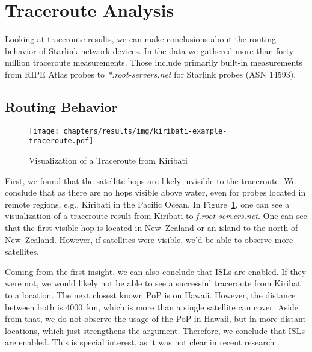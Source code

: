 
\section{Traceroute Analysis} \label{sec:traceroute-analysis}

Looking at traceroute results, we can make conclusions about the routing behavior of Starlink network devices. In the data we gathered more than forty million traceroute measurements. Those include primarily built-in measurements from RIPE Atlas probes to \textit{*.root-servers.net} for Starlink probes (\ac{ASN} 14593).

\subsection*{Routing Behavior}

\begin{figure}
	\texttt{[image: chapters/results/img/kiribati-example-traceroute.pdf]}
	\caption{Visualization of a Traceroute from Kiribati}
	\label{fig:kiribati-example-traceroute}
\end{figure}

First, we found that the satellite hops are likely invisible to the traceroute. We conclude that as there are no hops visible above water, even for probes located in remote regions, e.g., Kiribati in the Pacific Ocean. In Figure~\ref{fig:kiribati-example-traceroute}, one can see a visualization of a traceroute result from Kiribati to \textit{f.root-servers.net}. One can see that the first visible hop is located in New~Zealand or an island to the north of New~Zealand. However, if satellites were visible, we'd be able to observe more satellites.

Coming from the first insight, we can also conclude that \ac{ISLs} are enabled. If they were not, we would likely not be able to see a successful traceroute from Kiribati to a location. The next closest known \ac{PoP} is on Hawaii. However, the distance between both is 4000~km, which is more than a single satellite can cover. Aside from that, we do not observe the usage of the \ac{PoP} in Hawaii, but in more distant locations, which just strengthens the argument. Therefore, we conclude that \ac{ISLs} are enabled. This is special interest, as it was not clear in recent research \cite{Hauri2020}.

